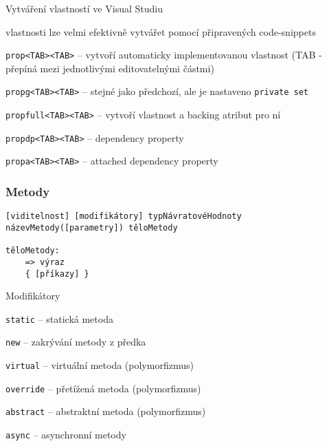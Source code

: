 \begin{frame}[fragile]
\begin{bitemize}{Vytváření vlastností ve Visual Studiu}
\item vlastnosti lze velmi efektivně vytvářet pomocí připravených code-snippets
\item []
\item \lstinline|prop<TAB><TAB>| -- vytvoří automaticky implementovanou vlastnost (TAB - přepíná mezi jednotlivými editovatelnými částmi)
\item \lstinline|propg<TAB><TAB>| -- stejné jako předchozí, ale je nastaveno \lstinline|private set|
\item \lstinline|propfull<TAB><TAB>| -- vytvoří vlastnost a backing atribut pro ní
\item \lstinline|propdp<TAB><TAB>| -- dependency property
\item \lstinline|propa<TAB><TAB>| -- attached dependency property
\end{bitemize}
\end{frame}




\begin{frame}[fragile]
\frametitle{Metody}
\vfill
\begin{noteblock}{}
\begin{lstlisting}
[viditelnost] [modifikátory] typNávratovéHodnoty názevMetody([parametry]) těloMetody

těloMetody:
	=> výraz
	{ [příkazy] }
\end{lstlisting}
\end{noteblock}
\vfill
\begin{bitemize}{Modifikátory}
\item \lstinline|static| -- statická metoda
\item \lstinline|new| -- zakrývání metody z předka
\item \lstinline|virtual| -- virtuální metoda (polymorfizmus)
\item \lstinline|override| -- přetížená metoda (polymorfizmus)
\item \lstinline|abstract| -- abstraktní metoda (polymorfizmus)
\item \lstinline[morekeywords=async]|async| -- asynchronní metody
\end{bitemize}
\vfill
\end{frame}



